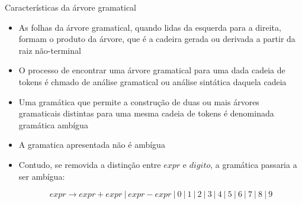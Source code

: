 \begin{frame}[fragile]{Características da árvore gramatical}

    \begin{itemize}
        \item As folhas da árvore gramatical, quando lidas da esquerda para a direita, formam o produto da árvore, que é a cadeira gerada ou derivada a partir
            da raiz não-terminal
            \pause

        \item O processo de encontrar uma árvore gramatical para uma dada cadeia de tokens é chmado de análise gramatical ou análise sintática daquela cadeia
        \pause

        \item Uma gramática que permite a construção de duas ou mais árvores gramaticais distintas para uma mesma cadeia de tokens é denominada gramática
            ambígua
        \pause

        \item A gramatica apresentada não é ambígua
        \pause

        \item Contudo, se removida a distinção entre $expr$ e $digito$, a gramática passaria a ser ambígua:
        \begin{footnotesize}
        \[
            expr \to expr + expr\ |\ expr - expr\ |\ 0 \ | \  1 \ | \  2 \ | \  3 \ | \  4 \ | \  5 \ | \  6 \ | \  7 \ | \  8 \ | \  9
        \]
        \end{footnotesize}
    \end{itemize}

\end{frame}

